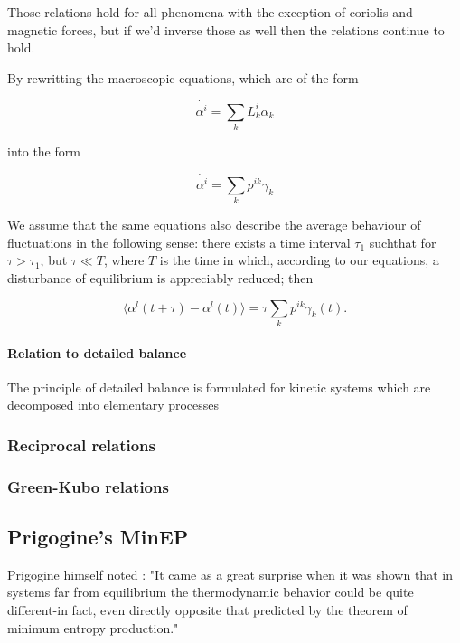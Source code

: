\documentclass[a4paper,12pt,nofootinbib]{article}
\begin{document}
Those relations hold for all phenomena with the exception of coriolis and magnetic forces, but if we'd inverse those as well then the relations continue to hold.

By rewritting the macroscopic equations, which are of the form

\begin{equation}
  \dot{\alpha^i}= \sum_k L_k^i \alpha_k
\end{equation}

into the form

\begin{equation}
  \dot{\alpha^i}= \sum_k p^{ik} \gamma_k
\end{equation}

We assume that the same equations also describe the average behaviour of fluctuations in the following sense: there exists a time interval $\tau_1$ suchthat for $\tau > \tau_1$, but $\tau \ll T$, where $T$ is the time in which, according to our equations, a disturbance of equilibrium is appreciably reduced; then

\begin{equation}
    \langle \alpha^l(t+\tau)- \alpha^l (t) \rangle = \tau \sum_k p^{ik} \gamma_k(t).
\end{equation}
		

\paragraph{Relation to detailed balance}

The principle of detailed balance is formulated for kinetic systems which are decomposed into elementary processes
\subsubsection{Reciprocal relations}

\subsubsection{Green-Kubo relations}


\subsection{Prigogine's MinEP}
Prigogine himself noted \cite{Prigogine:1979ul}:
"It came as a great surprise when it was shown that in systems far from equilibrium the thermodynamic behavior could be quite different-in fact, even directly opposite that predicted by the theorem of minimum entropy production."
\end{document}

